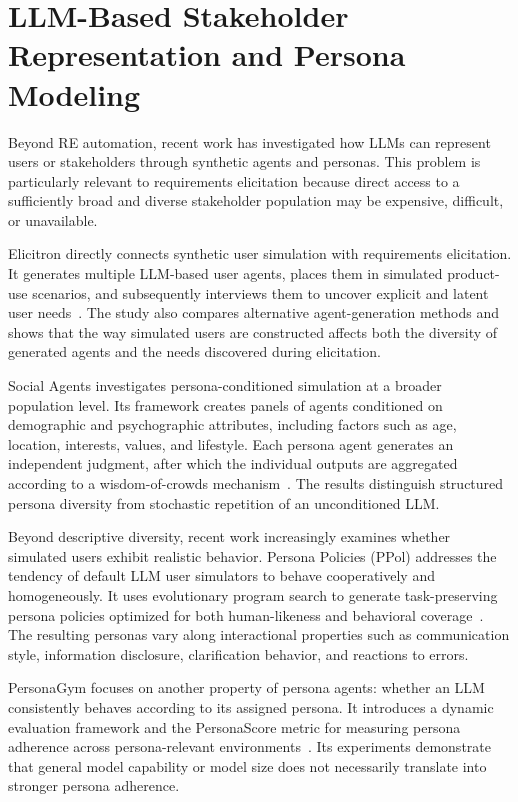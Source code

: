 \section{LLM-Based Stakeholder Representation and Persona Modeling}
\label{sec:rw-persona}

Beyond RE automation, recent work has investigated how LLMs can represent users or stakeholders through synthetic agents and personas. This problem is particularly relevant to requirements elicitation because direct access to a sufficiently broad and diverse stakeholder population may be expensive, difficult, or unavailable.

Elicitron directly connects synthetic user simulation with requirements elicitation. It generates multiple LLM-based user agents, places them in simulated product-use scenarios, and subsequently interviews them to uncover explicit and latent user needs~\cite{ataei2025elicitron}. The study also compares alternative agent-generation methods and shows that the way simulated users are constructed affects both the diversity of generated agents and the needs discovered during elicitation.

Social Agents investigates persona-conditioned simulation at a broader population level. Its framework creates panels of agents conditioned on demographic and psychographic attributes, including factors such as age, location, interests, values, and lifestyle. Each persona agent generates an independent judgment, after which the individual outputs are aggregated according to a wisdom-of-crowds mechanism~\cite{bhattacharyya2026social}. The results distinguish structured persona diversity from stochastic repetition of an unconditioned LLM.

Beyond descriptive diversity, recent work increasingly examines whether simulated users exhibit realistic behavior. Persona Policies (PPol) addresses the tendency of default LLM user simulators to behave cooperatively and homogeneously. It uses evolutionary program search to generate task-preserving persona policies optimized for both human-likeness and behavioral coverage~\cite{chopra2026beyond}. The resulting personas vary along interactional properties such as communication style, information disclosure, clarification behavior, and reactions to errors.

PersonaGym focuses on another property of persona agents: whether an LLM consistently behaves according to its assigned persona. It introduces a dynamic evaluation framework and the PersonaScore metric for measuring persona adherence across persona-relevant environments~\cite{samuel2025personagym}. Its experiments demonstrate that general model capability or model size does not necessarily translate into stronger persona adherence.

